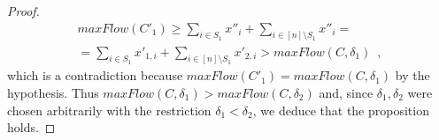 \begin{proof}
  \begin{equation*}
  \begin{gathered}
    maxFlow\left(C'_1\right) \geq \sum\limits_{i \in S_1}x''_i + \sum\limits_{i \in [n] \setminus S_1}x''_i = \\
    = \sum\limits_{i \in S_1}x'_{1, i} + \sum\limits_{i \in [n] \setminus S_1}x'_{2, i} > maxFlow(C, \delta_1) \enspace,
  \end{gathered}
  \end{equation*}
  which is a contradiction because $maxFlow\left(C'_1\right) = maxFlow\left(C, \delta_1\right)$ by the hypothesis. Thus
  $maxFlow\left(C, \delta_1\right) > maxFlow\left(C, \delta_2\right)$ and, since $\delta_1, \delta_2$ were chosen
  arbitrarily with the restriction $\delta_1 < \delta_2$, we deduce that the proposition holds.
\end{proof}
